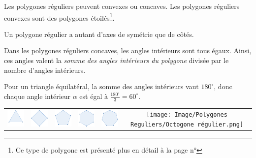 \documentclass[a4paper, twoside]{article}
\begin{document}
Les polygones réguliers peuvent convexes ou concaves.
Les polygones réguliers convexes sont des polygones étoilés\footnote{
	Ce type de polygone est présenté plus en détail à la page n°\pageref*{polygone_etoile}
}.

Un polygone régulier a autant d'axes de symétrie que de côtés.

Dans les polygones réguliers concaves, les angles intérieurs sont tous égaux.
Ainsi, ces angles valent la \textit{somme des angles intérieurs du polygone} divisée par le nombre d'angles intérieurs.

Pour un triangle équilatéral,
la somme des angles intérieurs vaut $180^\circ$,
donc chaque angle intérieur $\alpha$ est égal à $\frac{180^\circ}{3} = 60^\circ$.

\begin{center}
	\begin{tabular}{cccccc}
		\includegraphics[width=2cm]{Image/Polygones Reguliers/Triangle equilateral.png} &
		\includegraphics[width=2cm]{Image/Polygones Reguliers/Carre.png}                &
		\includegraphics[width=2cm]{Image/Polygones Reguliers/Pentagone regulier.png}   &
		\includegraphics[width=2cm]{Image/Polygones Reguliers/Hexagone regulier.png}    &
		\includegraphics[width=2cm]{Image/Polygones Reguliers/Heptagone regulier.png}   &
		\texttt{[image: Image/Polygones Reguliers/Octogone régulier.png]}                                                                                                                        \\


\end{tabular}
\end{center}
\end{document}
